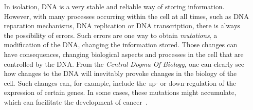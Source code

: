 In isolation, DNA is a very stable and reliable way of storing information. However, with many processes occurring within the cell at all times, such as DNA reparation mechanisms, DNA replication or DNA transcription, there is always the possibility of errors. Such errors are one way to obtain \emph{mutations}, a modification of the DNA, changing the information stored. Those changes can have consequences, changing biological aspects and processes in the cell that are controlled by the DNA. From the \emph{Central Dogma Of Biology}, one can clearly see how changes to the DNA will inevitably provoke changes in the biology of the cell. Such changes can, for example, include the up- or down-regulation of the expression of certain genes. In some cases, these mutations might accumulate, which can facilitate the development of cancer~\cite{stem_cell_mutations}.

